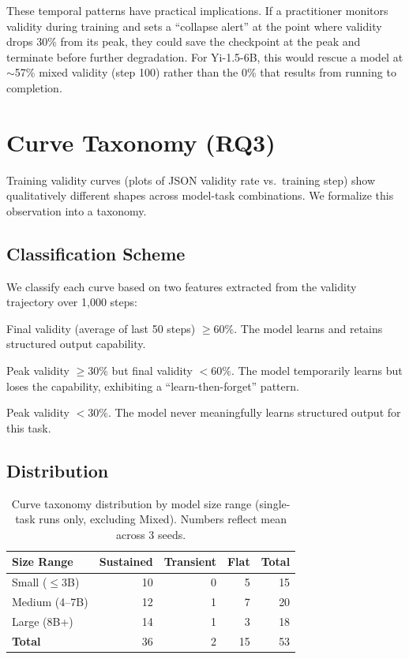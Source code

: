 \documentclass[11pt]{article}
\begin{document}
These temporal patterns have practical implications.  If a practitioner monitors validity during training and sets a ``collapse alert'' at the point where validity drops 30\% from its peak, they could save the checkpoint at the peak and terminate before further degradation.  For Yi-1.5-6B, this would rescue a model at $\sim$57\% mixed validity (step 100) rather than the 0\% that results from running to completion.

\section{Curve Taxonomy (RQ3)}
\label{sec:curves}

Training validity curves (plots of JSON validity rate vs.\ training step) show qualitatively different shapes across model-task combinations.  We formalize this observation into a taxonomy.

\subsection{Classification Scheme}

We classify each curve based on two features extracted from the validity trajectory over 1{,}000 steps:

\begin{description}[leftmargin=*]
\item[Sustained:] Final validity (average of last 50 steps) $\geq 60\%$.  The model learns and retains structured output capability.
\item[Transient:] Peak validity $\geq 30\%$ but final validity $< 60\%$.  The model temporarily learns but loses the capability, exhibiting a ``learn-then-forget'' pattern.
\item[Flat:] Peak validity $< 30\%$.  The model never meaningfully learns structured output for this task.
\end{description}

\subsection{Distribution}


\begin{table}[t]
\centering
\caption{Curve taxonomy distribution by model size range (single-task runs only, excluding Mixed).  Numbers reflect mean across 3 seeds.}
\label{tab:taxonomy}
\begin{tabular}{l rrr r}
\toprule
\textbf{Size Range} & \textbf{Sustained} & \textbf{Transient} & \textbf{Flat} & \textbf{Total} \\
\midrule
Small ($\leq$3B)     & 10 & 0  & 5  & 15 \\
Medium (4--7B)       & 12 & 1  & 7  & 20 \\
Large (8B+)          & 14 & 1  & 3  & 18 \\
\midrule
\textbf{Total}       & 36 & 2  & 15 & 53 \\
\bottomrule
\end{tabular}
\end{table}
\end{document}
